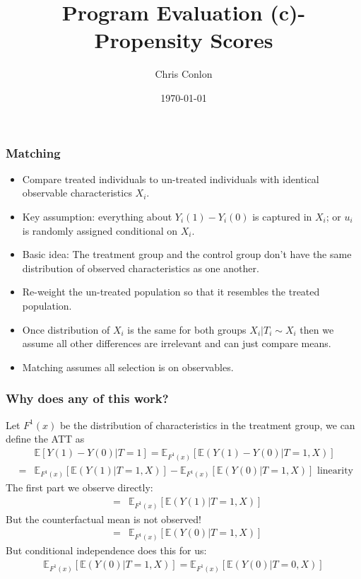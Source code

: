 \documentclass[xcolor=pdftex,dvipsnames,table,mathserif,aspectratio=169]{beamer}
\begin{document}
\title{Program Evaluation (c)- Propensity Scores}
\author{Chris Conlon}
\date{\today}

\frame{\titlepage}


\begin{frame}
\frametitle{Matching}
\begin{itemize}
\item Compare treated individuals to un-treated individuals with identical observable characteristics $X_i$.
\item Key assumption: everything about $Y_i(1) - Y_i(0)$ is captured in $X_i$; or $u_i$ is randomly assigned conditional on $X_i$.
\item Basic idea: The treatment group and the control group don't have the same distribution of observed characteristics as one another. 
\item \alert{Re-weight} the un-treated population so that it resembles the treated population.
\item Once distribution of $X_i$ is the same for both groups $ X_i | T_i \sim X_i$ then we assume all other differences are irrelevant and can just compare means.
\item Matching assumes \alert{all selection is on observables}.
\end{itemize}
\end{frame}



\begin{frame}
\frametitle{Why does any of this work?}
\small
Let  $F^{1}(x)$ be the distribution of characteristics in the treatment group, we can define the ATT as 
\begin{eqnarray*}
&&\mathbb{E}[Y(1) - Y(0) | T =1] =\mathbb{E}_{F^1(x)} \left[\mathbb{E}(Y(1) -Y(0) | T=1,X) \right] \\
&=&  \mathbb{E}_{F^1(x)} [\mathbb{E}(Y(1) | T=1,X)] -  \mathbb{E}_{F^1(x)} [\mathbb{E}(Y(0) | T=1,X)] \mbox{ linearity } 
\end{eqnarray*}
The first part we observe directly:
\begin{eqnarray*}
&=&  \mathbb{E}_{F^1(x)} [\mathbb{E}(Y(1) | T=1,X)] 
\end{eqnarray*}
But the counterfactual mean is not observed!
\begin{eqnarray*}
&=&  \mathbb{E}_{F^1(x)} [\mathbb{E}(Y(0) | T=1,X)] 
\end{eqnarray*}
But conditional independence does this for us:
\begin{eqnarray*}
 \mathbb{E}_{F^1(x)} [\mathbb{E}(Y(0) | T=1,X)]  =  \mathbb{E}_{F^1(x)} [\mathbb{E}(Y(0) | T=0,X)] 
\end{eqnarray*}
\end{frame}
\end{document}
